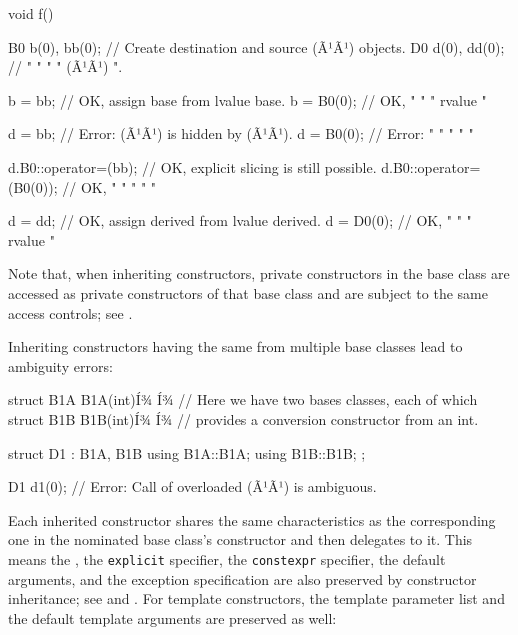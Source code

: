 \begin{emcppslisting}[language=C++]
void f()
{
    B0 b(0), bb(0);  // Create destination and source (Ã¹{}Ã¹) objects.
    D0 d(0), dd(0);  //   "         "       "    "    (Ã¹{}Ã¹)    ".

    b = bb;          // OK, assign base from lvalue base.
    b = B0(0);       // OK,   "       "   "  rvalue   "

    d = bb;          // Error: (Ã¹{}Ã¹) is hidden by (Ã¹{}Ã¹).
    d = B0(0);       // Error:       "         "    "     "        "

    d.B0::operator=(bb);     // OK, explicit slicing is still possible.
    d.B0::operator=(B0(0));  // OK,    "         "      "   "      "

    d = dd;          // OK, assign derived from lvalue derived.
    d = D0(0);       // OK,   "        "     "  rvalue    "
}
\end{emcppslisting}
    
\noindent Note that, when inheriting constructors, private constructors in the
base class are accessed as private constructors of that base class and
are subject to the same access controls; see . 

Inheriting constructors having the same  from multiple
base classes lead to ambiguity errors:

\begin{emcppslisting}[language=C++]
struct B1A { B1A(int)Í¾ }Í¾ // Here we have two bases classes, each of which
struct B1B { B1B(int)Í¾ }Í¾ // provides a conversion constructor from an int.

struct D1 : B1A, B1B
{
    using B1A::B1A;
    using B1B::B1B;
};

D1 d1(0);  // Error: Call of overloaded (Ã¹{}Ã¹) is ambiguous.
\end{emcppslisting}
    
\noindent Each inherited constructor shares the same characteristics as the
corresponding one in the nominated base class's constructor and then
delegates to it. This means the , the
\lstinline!explicit! specifier, the \lstinline!constexpr! specifier, the
default arguments, and the exception specification are also preserved by
constructor inheritance; see  and .  
For template
constructors, the template parameter list and the default template
arguments are preserved as well:

